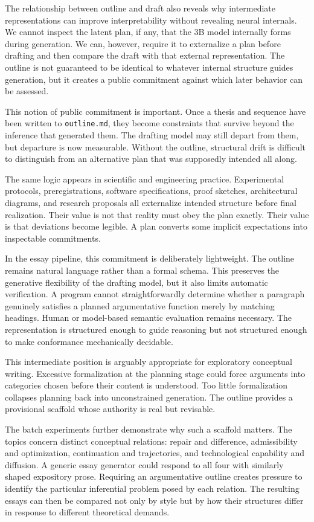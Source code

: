 \documentclass[11pt]{article}
\begin{document}
The relationship between outline and draft also reveals why intermediate representations can improve interpretability without revealing neural internals. We cannot inspect the latent plan, if any, that the 3B model internally forms during generation. We can, however, require it to externalize a plan before drafting and then compare the draft with that external representation. The outline is not guaranteed to be identical to whatever internal structure guides generation, but it creates a public commitment against which later behavior can be assessed.

This notion of public commitment is important. Once a thesis and sequence have been written to \texttt{outline.md}, they become constraints that survive beyond the inference that generated them. The drafting model may still depart from them, but departure is now measurable. Without the outline, structural drift is difficult to distinguish from an alternative plan that was supposedly intended all along.

The same logic appears in scientific and engineering practice. Experimental protocols, preregistrations, software specifications, proof sketches, architectural diagrams, and research proposals all externalize intended structure before final realization. Their value is not that reality must obey the plan exactly. Their value is that deviations become legible. A plan converts some implicit expectations into inspectable commitments.

In the essay pipeline, this commitment is deliberately lightweight. The outline remains natural language rather than a formal schema. This preserves the generative flexibility of the drafting model, but it also limits automatic verification. A program cannot straightforwardly determine whether a paragraph genuinely satisfies a planned argumentative function merely by matching headings. Human or model-based semantic evaluation remains necessary. The representation is structured enough to guide reasoning but not structured enough to make conformance mechanically decidable.

This intermediate position is arguably appropriate for exploratory conceptual writing. Excessive formalization at the planning stage could force arguments into categories chosen before their content is understood. Too little formalization collapses planning back into unconstrained generation. The outline provides a provisional scaffold whose authority is real but revisable.

The batch experiments further demonstrate why such a scaffold matters. The topics concern distinct conceptual relations: repair and difference, admissibility and optimization, continuation and trajectories, and technological capability and diffusion. A generic essay generator could respond to all four with similarly shaped expository prose. Requiring an argumentative outline creates pressure to identify the particular inferential problem posed by each relation. The resulting essays can then be compared not only by style but by how their structures differ in response to different theoretical demands.
\end{document}

